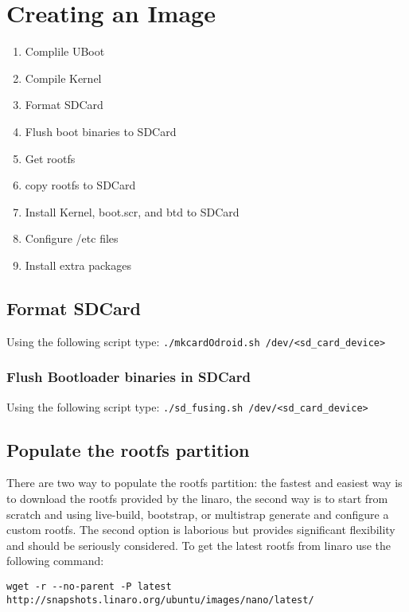 \section{Creating an Image}

\begin{enumerate}
 \item Complile UBoot
 \item Compile Kernel
 \item Format SDCard
 \item Flush boot binaries to SDCard
 \item Get rootfs
 \item copy rootfs to SDCard
 \item Install Kernel, boot.scr, and btd to SDCard
 \item Configure /etc files
 \item Install extra packages
\end{enumerate}

\subsection{Format SDCard}

Using the following script type: \texttt{./mkcardOdroid.sh /dev/<sd\_card\_device>}


\subsubsection{Flush Bootloader binaries in SDCard}

Using the following script type: \texttt{./sd\_fusing.sh /dev/<sd\_card\_device>}


\subsection{Populate the rootfs partition}

There are two way to populate the rootfs partition: the fastest and easiest way is to download the rootfs provided by the linaro, the second way is to start from scratch and using live-build, bootstrap, or multistrap generate and configure a custom rootfs. The second option is laborious but provides significant flexibility and should be seriously considered. To get the latest rootfs from linaro use the following command:

\begin{lstlisting}
wget -r --no-parent -P latest http://snapshots.linaro.org/ubuntu/images/nano/latest/
\end{lstlisting}


